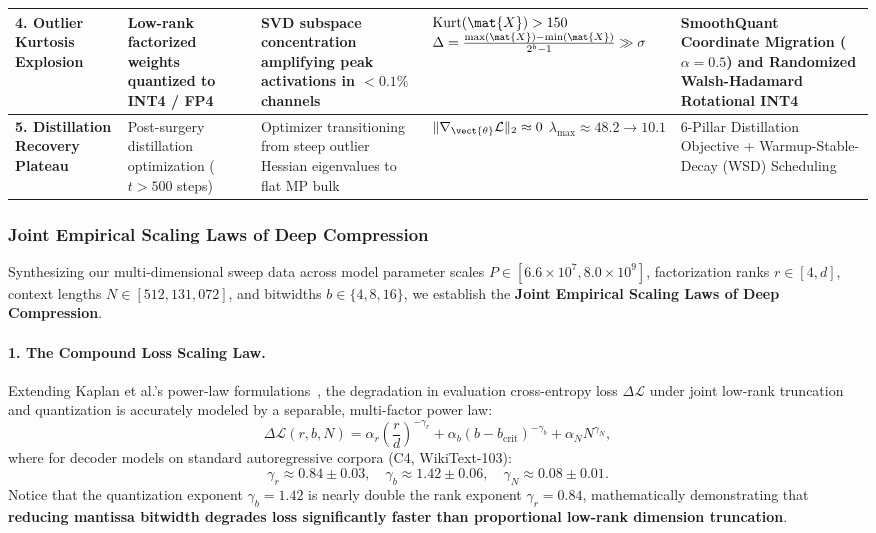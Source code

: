 \begin{table}[t]
{\begin{tabular}{@{}l p{3.8cm} p{3.6cm} p{4.2cm} p{5.0cm}@{}}
\midrule
\textbf{4. Outlier Kurtosis Explosion} &
Low-rank factorized weights quantized to INT4 / FP4 &
SVD subspace concentration amplifying peak activations in $<0.1\%$ channels &
$\operatorname{Kurt}(\mat{X}) > 150$ \newline $\Delta = \frac{\max(\mat{X}) - \min(\mat{X})}{2^b - 1} \gg \sigma$ &
SmoothQuant Coordinate Migration ($\alpha=0.5$) and Randomized Walsh-Hadamard Rotational INT4 \\
\midrule
\textbf{5. Distillation Recovery Plateau} &
Post-surgery distillation optimization ($t > 500$ steps) &
Optimizer transitioning from steep outlier Hessian eigenvalues to flat MP bulk &
$\|\nabla_{\vect{\theta}}\mathcal{L}\|_2 \approx 0$ \newline $\lambda_{\max} \approx 48.2 \to 10.1$ &
6-Pillar Distillation Objective + Warmup-Stable-Decay (WSD) Scheduling \\
\bottomrule
\end{tabular}%
}
\end{table}

\subsubsection{Joint Empirical Scaling Laws of Deep Compression}
\label{sec:phenom_scaling_laws}

Synthesizing our multi-dimensional sweep data across model parameter scales $P \in [6.6 \times 10^7, 8.0 \times 10^9]$, factorization ranks $r \in [4, d]$, context lengths $N \in [512, 131{,}072]$, and bitwidths $b \in \{4, 8, 16\}$, we establish the \textbf{Joint Empirical Scaling Laws of Deep Compression}.

\paragraph{1. The Compound Loss Scaling Law.}
Extending Kaplan et al.'s power-law formulations~\cite{kaplan2020scaling}, the degradation in evaluation cross-entropy loss $\Delta \mathcal{L}$ under joint low-rank truncation and quantization is accurately modeled by a separable, multi-factor power law:
\begin{equation}
\label{eq:joint_loss_scaling}
\Delta \mathcal{L}(r, b, N) = \alpha_r \left(\frac{r}{d}\right)^{-\gamma_r} + \alpha_b \left(b - b_{\text{crit}}\right)^{-\gamma_b} + \alpha_N N^{\gamma_N},
\end{equation}
where for decoder models on standard autoregressive corpora (C4, WikiText-103):
\begin{equation}
\gamma_r \approx 0.84 \pm 0.03, \quad \gamma_b \approx 1.42 \pm 0.06, \quad \gamma_N \approx 0.08 \pm 0.01.
\end{equation}
Notice that the quantization exponent $\gamma_b = 1.42$ is nearly double the rank exponent $\gamma_r = 0.84$, mathematically demonstrating that \textbf{reducing mantissa bitwidth degrades loss significantly faster than proportional low-rank dimension truncation}.

